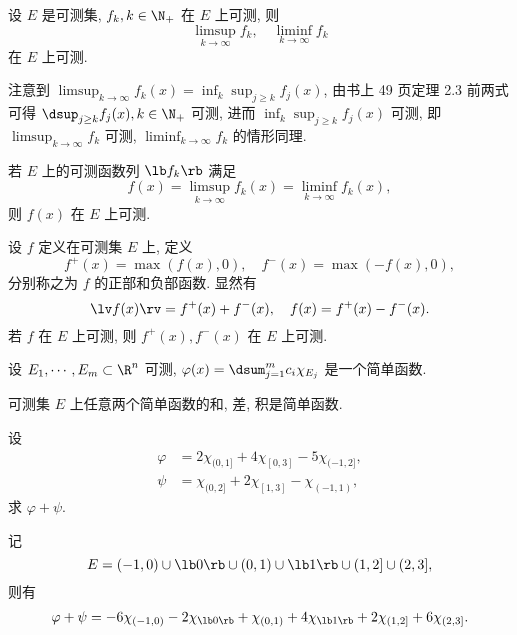 \documentclass[UTF8, a4paper, 12pt, twoside, onecolumn]{book}
\begin{document}
\begin{Theorem}
	设 $E$ 是可测集, $f_k, k \in \N_+$ 在 $E$ 上可测, 则
	$$\limsup_{k \to \infty} f_k,\quad \liminf_{k \to \infty} f_k$$
	在 $E$ 上可测.
\end{Theorem}

\begin{Proof}
	注意到 $\displaystyle\limsup_{k \to \infty} f_k(x) = \displaystyle\inf_k \displaystyle\sup_{j \geq k} f_j(x)$, 由书上 49 页定理 2.3 前两式可得 $\dsup_{j \geq k} f_j(x), k\in \N_+$ 可测, 进而 $\displaystyle\inf_k \displaystyle\sup_{j \geq k} f_j(x)$ 可测, 即 $\displaystyle\limsup_{k \to \infty} f_k$ 可测, $\displaystyle\liminf_{k \to \infty} f_k$ 的情形同理.
\end{Proof}

\begin{Corollary}
	若 $E$ 上的可测函数列 $\lb f_k \rb$ 满足
	$$f(x) = \displaystyle\limsup_{k \to \infty} f_k(x) = \displaystyle\liminf_{k \to \infty} f_k(x),$$
	则 $f(x)$ 在 $E$ 上可测.
\end{Corollary}

\begin{Theorem}
	设 $f$ 定义在可测集 $E$ 上, 定义
	$$f^+(x) = \max(f(x), 0),\quad f^-(x) = \max(-f(x), 0),$$
	分别称之为 $f$ 的正部和负部函数. 显然有
	$$\lv f(x) \rv = f^+(x) + f^-(x),\quad f(x) = f^+(x) - f^-(x).$$
	若 $f$ 在 $E$ 上可测, 则 $f^+(x), f^-(x)$ 在 $E$ 上可测.
\end{Theorem}

\begin{Example}
	设 $E_1, \cdots, E_m \subset \R^n$ 可测, $\varphi(x)= \dsum_{j = 1}^{m} c_i \chi_{E_j}$ 是一个简单函数.
\end{Example}

\begin{Proposition}
	可测集 $E$ 上任意两个简单函数的和, 差, 积是简单函数.
\end{Proposition}

\begin{Example}
	设
	\begin{align*}
		\varphi &= 2\chi_{(0, 1]} + 4 \chi_{[0, 3]} - 5 \chi_{(-1, 2]}, \\
		\psi &= \chi_{(0, 2]} + 2\chi_{[1, 3]} - \chi_{(-1, 1)},
	\end{align*}
	求 $\varphi + \psi$.

\begin{Solve}
	记
	$$E = (-1, 0) \cup \lb 0 \rb \cup (0, 1) \cup \lb 1 \rb \cup (1, 2] \cup (2, 3],$$
	则有
	\begin{align*}
		\varphi + \psi = -6 \chi_{(-1, 0)} - 2\chi_{\lb 0 \rb} + \chi_{(0, 1)} + 4 \chi_{\lb 1 \rb} + 2 \chi_{(1, 2]} + 6\chi_{(2, 3]}.
	\end{align*}
\end{Solve}
\end{Example}
\end{document}
